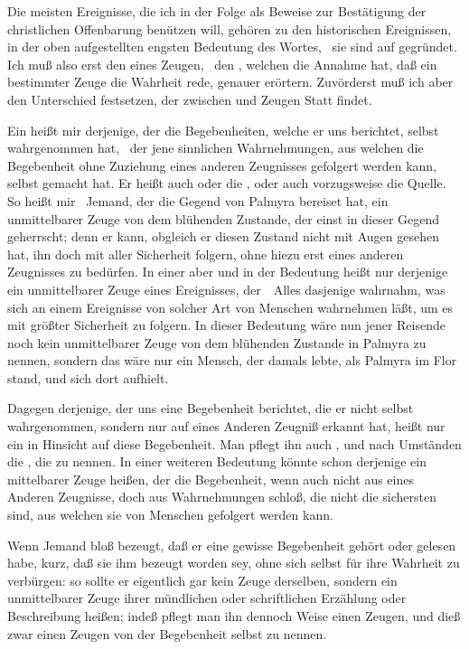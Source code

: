 Die meisten Ereignisse, die ich in der Folge als Beweise zur Bestätigung der christlichen Offenbarung benützen will, gehören zu den historischen Ereignissen, in der oben aufgestellten engsten Bedeutung des Wortes, \dh\ sie sind auf  gegründet. Ich muß also erst den  eines Zeugen, \dh\ den , welchen die Annahme hat, daß ein bestimmter Zeuge die Wahrheit rede, genauer erörtern. Zuvörderst muß ich aber den Unterschied festsetzen, der zwischen  und  Zeugen Statt findet.
\begin{aufza}
\item Ein  heißt mir derjenige, der die Begebenheiten, welche er uns berichtet, selbst wahrgenommen hat, \dh\ der jene sinnlichen Wahrnehmungen, aus welchen die Begebenheit ohne Zuziehung eines anderen Zeugnisses gefolgert werden kann, selbst gemacht hat. Er heißt auch  oder die , oder auch vorzugsweise die Quelle. So heißt mir \zB\ Jemand, der die Gegend von Palmyra bereiset hat, ein unmittelbarer Zeuge von dem blühenden Zustande, der einst in dieser Gegend geherrscht; denn er kann, obgleich er diesen Zustand nicht mit Augen gesehen hat, ihn doch mit aller Sicherheit folgern, ohne hiezu erst eines anderen Zeugnisses zu bedürfen. In einer  aber und in der  Bedeutung heißt nur derjenige ein unmittelbarer Zeuge eines Ereignisses, der~\ Alles dasjenige wahrnahm, was sich an einem Ereignisse von solcher Art von Menschen wahrnehmen läßt, um es mit größter Sicherheit zu folgern. In dieser Bedeutung wäre nun jener Reisende noch kein unmittelbarer Zeuge von dem blühenden Zustande in Palmyra zu nennen, sondern das wäre nur ein Mensch, der damals lebte, als Palmyra im Flor stand, und sich dort aufhielt.
\item Dagegen derjenige, der uns eine Begebenheit berichtet, die er nicht selbst wahrgenommen, sondern nur auf eines Anderen Zeugniß erkannt hat, heißt nur ein  in Hinsicht auf diese Begebenheit. Man pflegt ihn auch , und nach Umständen die , die  zu nennen. In einer weiteren Bedeutung könnte schon derjenige ein mittelbarer Zeuge heißen, der die Begebenheit, wenn auch nicht aus eines Anderen Zeugnisse, doch aus Wahrnehmungen schloß, die nicht die sichersten sind, aus welchen sie von Menschen gefolgert werden kann.
\item Wenn Jemand bloß bezeugt, daß er eine gewisse Begebenheit gehört oder gelesen habe, kurz, daß sie ihm bezeugt worden sey, ohne sich selbst für ihre Wahrheit zu verbürgen: so sollte er eigentlich gar kein Zeuge derselben, sondern ein unmittelbarer Zeuge ihrer mündlichen oder schriftlichen Erzählung oder Beschreibung heißen; indeß pflegt man ihn dennoch  Weise einen Zeugen, und dieß zwar einen  Zeugen von der Begebenheit selbst zu nennen.
\end{aufza}

